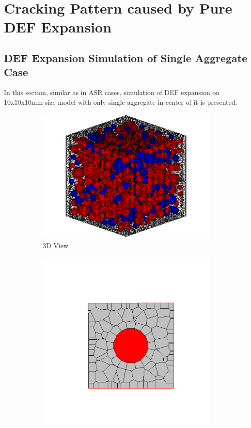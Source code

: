 \section{Cracking Pattern caused by Pure DEF Expansion}

\subsection{DEF Expansion Simulation of Single Aggregate Case}

In this section, similar as in ASR cases, simulation of DEF expansion on 10x10x10mm size model with only single aggregate in center of it is presented.

\begin{figure}[h!]
\centering
\begin{subfigure}{.25\textwidth}
  \centering
  \includegraphics[width=1.0\linewidth]{Files/Aggregate/A30P75.png}
\caption{3D View}
\end{subfigure}%
\begin{subfigure}{.25\textwidth}
  \centering
  \includegraphics[width=1.0\linewidth]{Files/Small_ASR/CR/DEP5-STEP(001).png}

\end{subfigure}
\end{figure}
